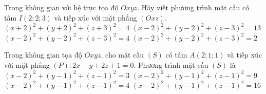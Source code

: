 \begin{ex}%
	Trong không gian với hệ trục  tọa độ $Oxyz$. Hãy viết phương trình mặt cầu có tâm $I\left(2;2;3\right)$ và tiếp xúc với mặt phẳng $\left(Oxz\right)$.
	\choice 
		 {$\left(x+2\right)^2+\left(y+2\right)^2+\left(z+3\right)^2=4$}
		 {$\left(x-2\right)^2+\left(y-2\right)^2+\left(z-3\right)^2=13$}
		{\True $\left(x-2\right)^2+\left(y-2\right)^2+\left(z-3\right)^2=4$} 
		 {$\left(x-2\right)^2+\left(y-2\right)^2+\left(z-3\right)^2=2$}
\end{ex}

\begin{ex}%
	Trong không gian tọa độ $Oxyz$, cho mặt cầu $(S)$ có tâm $A\left(2;1;1\right)$ và tiếp xúc với mặt phẳng $(P)\colon 2x-y+2z+1=0$. Phương trình mặt  cầu $(S)$ là
	\choice 
		 {$\left(x-2\right)^2+\left(y-1\right)^2+\left(z-1\right)^2=3$}
		 {$\left(x-2\right)^2+\left(y-1\right)^2+\left(z-1\right)^2=9$}
		 {\True $\left(x-2\right)^2+\left(y-1\right)^2+\left(z-1\right)^2=4$}
		 {$\left(x-2\right)^2+\left(y-1\right)^2+\left(z-1\right)^2=16$}
\end{ex}


